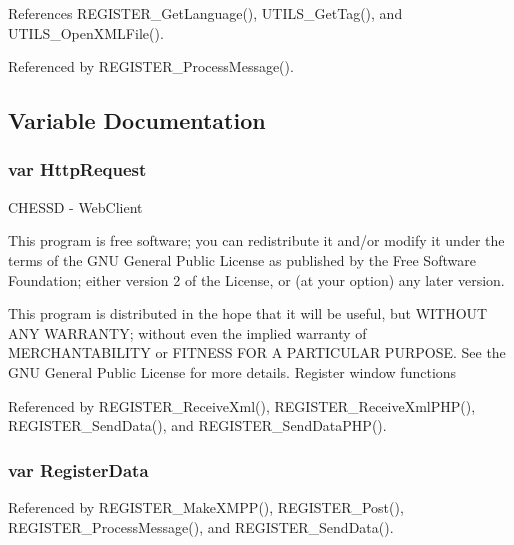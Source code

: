 References REGISTER\_\-GetLanguage(), UTILS\_\-GetTag(), and UTILS\_\-OpenXMLFile().

Referenced by REGISTER\_\-ProcessMessage().

\subsection{Variable Documentation}
\subsubsection{\setlength{\rightskip}{0pt plus 5cm}var {\bf HttpRequest}}\label{register_8js_7766c35e097d0534a3567286da65c2d2}


CHESSD - WebClient

This program is free software; you can redistribute it and/or modify it under the terms of the GNU General Public License as published by the Free Software Foundation; either version 2 of the License, or (at your option) any later version.

This program is distributed in the hope that it will be useful, but WITHOUT ANY WARRANTY; without even the implied warranty of MERCHANTABILITY or FITNESS FOR A PARTICULAR PURPOSE. See the GNU General Public License for more details. Register window functions 

Referenced by REGISTER\_\-ReceiveXml(), REGISTER\_\-ReceiveXmlPHP(), REGISTER\_\-SendData(), and REGISTER\_\-SendDataPHP().
\subsubsection{\setlength{\rightskip}{0pt plus 5cm}var {\bf RegisterData}}\label{register_8js_4583a8d58cbb1b7308bdb36dc1ec5b56}




Referenced by REGISTER\_\-MakeXMPP(), REGISTER\_\-Post(), REGISTER\_\-ProcessMessage(), and REGISTER\_\-SendData().